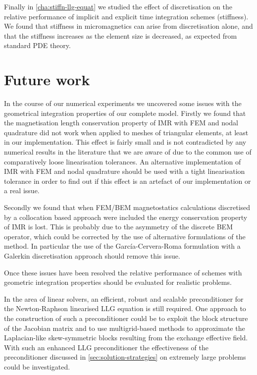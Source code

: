 Finally in \cref{cha:stiffn-llg-equat} we studied the effect of discretisation on the relative performance of implicit and explicit time integration schemes (stiffness).
We found that stiffness in micromagnetics can arise from discretisation alone, and that the stiffness increases as the element size is decreased, as expected from standard PDE theory.



\section{Future work}


In the course of our numerical experiments we uncovered some issues with the geometrical integration properties of our complete model.
Firstly we found that the magnetisation length conservation property of IMR with FEM and nodal quadrature did not work when applied to meshes of triangular elements, at least in our implementation.
This effect is fairly small and is not contradicted by any numerical results in the literature that we are aware of due to the common use of comparatively loose linearisation tolerances.
An alternative implementation of IMR with FEM and nodal quadrature should be used with a tight linearisation tolerance in order to find out if this effect is an artefact of our implementation or a real issue.

Secondly we found that when FEM/BEM magnetostatics calculations discretised by a collocation based approach were included the energy conservation property of IMR is lost.
This is probably due to the asymmetry of the discrete BEM operator, which could be corrected by the use of alternative formulations of the method.
In particular the use of the Garc\'{i}a-Cervera-Roma formulation \cite{Garcia-Cervera2006} with a Galerkin discretisation approach \cite[75]{Wrobel2002} should remove this issue.

Once these issues have been resolved the relative performance of schemes with geometric integration properties should be evaluated for realistic problems.

In the area of linear solvers, an efficient, robust and scalable preconditioner for the Newton-Raphson linearised LLG equation is still required.
One approach to the construction of such a preconditioner could be to exploit the block structure of the Jacobian matrix and to use multigrid-based methods to approximate the Laplacian-like skew-symmetric blocks resulting from the exchange effective field.
With such an enhanced LLG preconditioner the effectiveness of the preconditioner discussed in \cref{sec:solution-strategies} on extremely large problems could be investigated.



